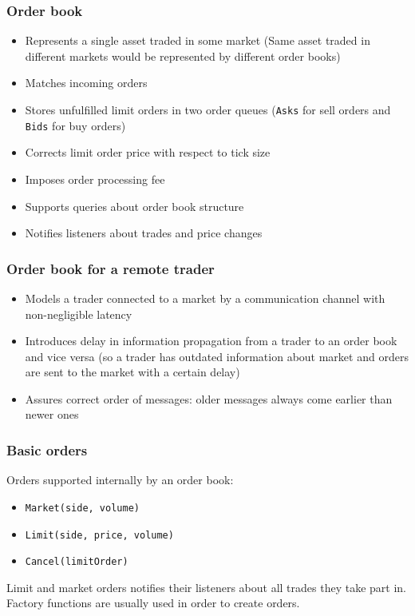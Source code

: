 \documentclass{beamer}
\begin{document}
\begin{frame}
\frametitle{Order book}
\begin{itemize}
  \item Represents a single asset traded in some market (Same asset traded in different markets would be represented by different order books)
  \item Matches incoming orders
  \item Stores unfulfilled limit orders in two order queues (\texttt{Asks} for sell orders and \texttt{Bids} for buy orders)
  \item Corrects limit order price with respect to tick size
  \item Imposes order processing fee
  \item Supports queries about order book structure
  \item Notifies listeners about trades and price changes
\end{itemize}
\end{frame}

\begin{frame}
\frametitle{Order book for a remote trader}
\begin{itemize}
  \item Models a trader connected to a market by a communication channel with non-negligible latency
  \item Introduces delay in information propagation from a trader to an order book and vice versa (so a trader has outdated information about market and orders are sent to the market with a certain delay)
  \item Assures correct order of messages: older messages always come earlier than newer ones
\end{itemize}
\end{frame}

\begin{frame}
\frametitle{Basic orders}
Orders supported internally by an order book:
\begin{itemize}
  \item \texttt{Market(side, volume)}
  \item \texttt{Limit(side, price, volume)}
  \item \texttt{Cancel(limitOrder)}
\end{itemize}
Limit and market orders notifies their listeners about all trades they take part in.
Factory functions are usually used in order to create orders.
\end{frame}
\end{document}
